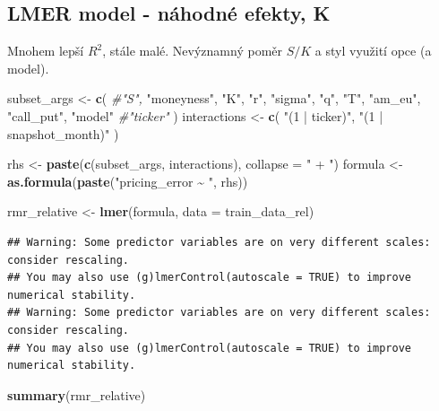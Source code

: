 \documentclass[
]{article}
\newenvironment{Shaded}{\begin{snugshade}}{\end{snugshade}}
\newcommand{\AttributeTok}[1]{\textcolor[rgb]{0.13,0.29,0.53}{#1}}
\newcommand{\CommentTok}[1]{\textcolor[rgb]{0.56,0.35,0.01}{\textit{#1}}}
\newcommand{\FunctionTok}[1]{\textcolor[rgb]{0.13,0.29,0.53}{\textbf{#1}}}
\newcommand{\NormalTok}[1]{#1}
\newcommand{\OtherTok}[1]{\textcolor[rgb]{0.56,0.35,0.01}{#1}}
\newcommand{\StringTok}[1]{\textcolor[rgb]{0.31,0.60,0.02}{#1}}
\begin{document}
\subsection{LMER model - náhodné efekty,
K}\label{lmer-model---nuxe1hodnuxe9-efekty-k}

Mnohem lepší \(R^2\), stále malé. Nevýznamný poměr \(S/K\) a styl
využití opce (a model).

\begin{Shaded}
\begin{Highlighting}[]
\NormalTok{subset\_args }\OtherTok{\textless{}{-}} \FunctionTok{c}\NormalTok{(}
  \CommentTok{\#"S",}
  \StringTok{"moneyness"}\NormalTok{,}
  \StringTok{"K"}\NormalTok{,}
  \StringTok{"r"}\NormalTok{,}
  \StringTok{"sigma"}\NormalTok{,}
  \StringTok{"q"}\NormalTok{,}
  \StringTok{"T"}\NormalTok{,}
  \StringTok{"am\_eu"}\NormalTok{,}
  \StringTok{"call\_put"}\NormalTok{,}
  \StringTok{"model"}
  \CommentTok{\#"ticker"}
\NormalTok{)}
\NormalTok{interactions }\OtherTok{\textless{}{-}} \FunctionTok{c}\NormalTok{(}
  \StringTok{"(1 | ticker)"}\NormalTok{,}
  \StringTok{"(1 | snapshot\_month)"}
\NormalTok{)}

\NormalTok{rhs }\OtherTok{\textless{}{-}} \FunctionTok{paste}\NormalTok{(}\FunctionTok{c}\NormalTok{(subset\_args, interactions), }\AttributeTok{collapse =} \StringTok{" + "}\NormalTok{)}
\NormalTok{formula }\OtherTok{\textless{}{-}} \FunctionTok{as.formula}\NormalTok{(}\FunctionTok{paste}\NormalTok{(}\StringTok{"pricing\_error \textasciitilde{} "}\NormalTok{, rhs))}

\NormalTok{rmr\_relative }\OtherTok{\textless{}{-}} \FunctionTok{lmer}\NormalTok{(formula, }\AttributeTok{data =}\NormalTok{ train\_data\_rel)}
\end{Highlighting}
\end{Shaded}

\begin{verbatim}
## Warning: Some predictor variables are on very different scales: consider rescaling. 
## You may also use (g)lmerControl(autoscale = TRUE) to improve numerical stability.
## Warning: Some predictor variables are on very different scales: consider rescaling. 
## You may also use (g)lmerControl(autoscale = TRUE) to improve numerical stability.
\end{verbatim}

\begin{Shaded}
\begin{Highlighting}[]
\FunctionTok{summary}\NormalTok{(rmr\_relative)}
\end{Highlighting}
\end{Shaded}
\end{document}
